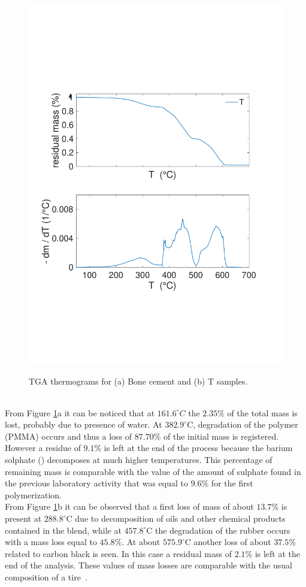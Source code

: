 \documentclass[a4paper, 11pt]{article}
\begin{document}
\begin{figure}[htp]
{\includegraphics[scale=0.4]{tgaT}} \quad 
\captionsetup{justification=centering}
\caption{TGA thermograms for (a) Bone cement and (b) T samples.}
\label{fig:tga}
\end{figure}\\
From Figure \ref{fig:tga}a it can be noticed that at $161.6^\circ C $ the $2.35 \%$ of the total mass is lost, probably due to presence of water. At $382.9^\circ$C, degradation of the polymer (PMMA) occurs and thus a loss of $87.70\%$ of the initial mass is registered. However a residue of $9.1\%$ is left at the end of the process because the barium solphate () decomposes at much higher temperatures. This percentage of remaining mass is comparable with the value of the amount of sulphate found in the previous laboratory activity that was equal to $9.6\%$ for the first polymerization. \\
From Figure \ref{fig:tga}b it can be observed that a first loss of mass of about $13.7\%$ is present at $288.8^\circ$C due to decomposition of oils and other chemical products contained in the blend, while at $457.8^\circ$C the degradation of the rubber occurs with a mass loss equal to $45.8\%$. At about $575.9^\circ$C another loss of about $37.5\%$ related to carbon black is seen. In this case a residual mass of $2.1\%$ is left at the end of the analysis. These values of mass losses are comparable with the usual composition of a tire~\cite{gommista}.\\
\end{document}
